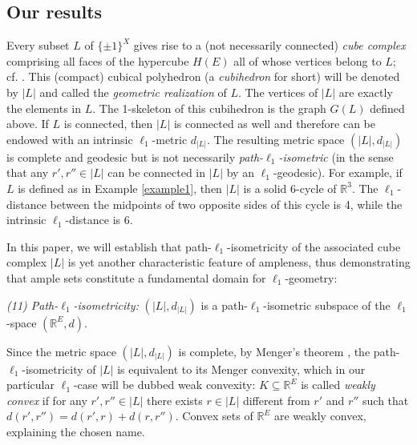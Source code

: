 \documentclass[11pt,a4paper]{amsart}
\theoremstyle{definition}
\numberwithin{equation}{section}
\newcommand{\covectors}{\ensuremath{L}}
\newcommand{\HH}{\ensuremath{H}}
\begin{document}
\subsection*{Our results}
Every subset ${\covectors}$ of $\{ \pm 1\}^X$ gives rise to a (not necessarily connected)
{\it cube complex} comprising all faces of the hypercube ${\HH}(E)$ all of whose vertices
belong to ${\covectors};$ cf. \cite{VdV}. This (compact) cubical polyhedron
(a {\it cubihedron} for short) will be denoted by $|{\covectors}|$ and
called the  {\it geometric realization} of $\covectors$. The vertices of $|{\covectors}|$
are exactly the elements in ${\covectors}$.  %
The 1-skeleton  of this cubihedron is the graph $G({\covectors})$ defined above. %
If
$\covectors$ is connected, then $|{\covectors}\vert$ is connected
as well and therefore can be endowed with an intrinsic
$\ell_1$-metric $d_{|{\covectors}|}$. The resulting metric space
$(\vert {\covectors}\vert,d_{|{\covectors}|})$ is complete and
geodesic but is not
necessarily \emph{path-$\ell_1$-isometric}  (in the sense that any $r',r''\in \vert {\covectors}\vert$
can be connected in $\vert {\covectors}\vert$ by an $\ell_1$-geodesic).
For example, if $\covectors$ is defined as in Example \ref{example1},
then $|{\covectors}|$ is a solid 6-cycle of ${\mathbb
R}^3.$ The $\ell_1$-distance between the midpoints of two opposite
sides of this cycle is 4, while the intrinsic $\ell_1$-distance is 6.

In this paper, we will establish
that  path-$\ell_1$-isometricity  of %
the associated cube complex $\vert {\covectors}\vert$
is yet another characteristic feature of ampleness,
thus demonstrating that ample sets constitute a fundamental
domain for $\ell_1$-geometry:

\medskip\noindent
{\it {\rm(11)} Path-$\ell_1$-isometricity:}  $(\vert {\covectors}\vert,d_{|{\covectors}|})$ is  a
path-$\ell_1$-isometric subspace of the $\ell_1$-space $({\mathbb
R}^E,d)$.

\medskip
Since  the metric space $(\vert {\covectors}\vert,d_{|{\covectors}|})$  is complete, by Menger's theorem  \cite{Me},
the path-$\ell_1$-isometricity of $|\covectors|$   is equivalent to its Menger convexity, which in our particular $\ell_1$-case will be dubbed  weak convexity: $K\subseteq {\mathbb R}^E$ is called \emph{weakly convex} if  for any $r',r''\in \vert {\covectors}\vert$ there exists
$r\in \vert {\covectors}\vert$ different from $r'$ and $r''$ such that $d(r',r'')=d(r',r)+d(r,r'')$. Convex sets of ${\mathbb R}^E$ are weakly convex, explaining the chosen name.
\end{document}

